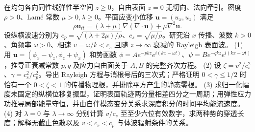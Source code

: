 在均匀各向同性线弹性半空间 \(z\ge0\)，自由表面 \(z=0\) 无切向、法向牵引。密度 \(\rho>0\)、Lamé 常数 \(\mu>0,\lambda\ge0\)。平面应变小位移 \(\boldsymbol u=(u_x,u_z)\) 满足
\[
\rho\boldsymbol u_{tt}=(\lambda+\mu)\nabla(\nabla\cdot\boldsymbol u)+\mu\nabla^2\boldsymbol u.
\]
设纵横波速分别为 \(c_p=\sqrt{(\lambda+2\mu)/\rho}\)、\(c_s=\sqrt{\mu/\rho}\)。研究沿 \(x\) 传播、波数 \(k>0\)、角频率 \(\omega>0\)、相速 \(v=\omega/k<c_s\) 且随 \(z\to\infty\) 衰减的 Rayleigh 表面波。
(1) 用 \(\boldsymbol u=(\phi_x-\psi_z,\phi_z+\psi_x)\) 和势函数 \(\phi=Ae^{-pkz}e^{i(kx-\omega t)}\)、\(\psi=Be^{-qkz}e^{i(kx-\omega t)}\)，推导正衰减常数 \(p,q\) 及应力自由面关于 \(A,B\) 的完整齐次方程。
(2) 设 \(\zeta=v^2/c_s^2\)、\(\gamma=c_s^2/c_p^2\)。导出 Rayleigh 方程与消根号后的三次式；严格证明 \(0<\gamma\le1/2\) 时恰有一个 \(0<\zeta<1\) 的传播物理根，并排除平方产生的静态零根。
(3) 求归一化幅度未固定的纵横位移复振型，证明表面轨迹两分量相差四分之一周期；用弹性应力功推导局部能量守恒，并由自伴模态变分关系求深度积分的时间平均能流速度。
(4) 对 \(\lambda=0\) 与 \(\lambda\to\infty\) 分别计算 \(v/c_s\) 至至少六位有效数字，求两种势的穿透长度；解释无截止色散以及 \(v<c_s<c_p\) 与体波辐射条件的关系。